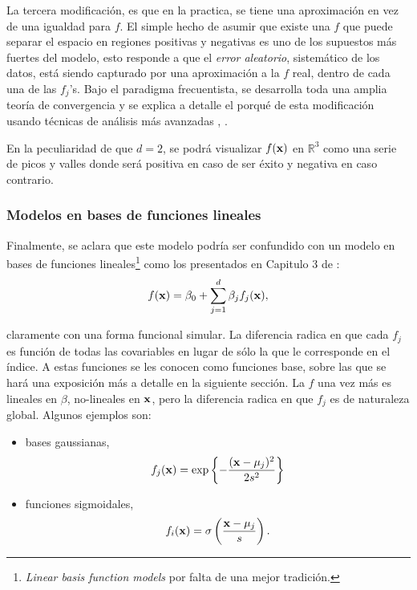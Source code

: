\documentclass[../Main/Main.tex]{subfiles}
\begin{document}
La tercera modificación, es que en la practica, se tiene una aproximación en vez de una igualdad para $f$. El simple hecho de asumir que existe una $f$ que puede separar el espacio en regiones positivas y negativas es uno de los supuestos más fuertes del modelo, esto responde a que el \textit{error aleatorio}, sistemático de los datos, está siendo capturado por una aproximación a la $f$ real, dentro de cada una de las $f_j$'s. Bajo el paradigma frecuentista, se desarrolla toda una amplia teoría de convergencia y se explica a detalle el porqué de esta modificación usando técnicas de análisis más avanzadas \autocite{bergstrom1985estimation}, \autocite{stone1985additive}. 

En la peculiaridad de que $d = 2$, se podrá visualizar $f(\mathbf{x})$ en $\mathbb{R}^3$ como una serie de picos y valles donde será positiva en caso de ser éxito y negativa en caso contrario.

\subsubsection*{Modelos en bases de funciones lineales}

Finalmente, se aclara que este modelo podría ser confundido con un modelo en bases de funciones lineales\footnote{\textit{Linear basis function models} por falta de una mejor tradición.} como los presentados en Capitulo 3 de \citet{bishop2006pattern}:
\begin{align} 
	f(\mathbf{x}) = \beta_0 + \sum_{j = 1}^d\beta_j f_j(\mathbf{x}), \label{ec:ExpansionBases1}
\end{align}

claramente con una forma funcional simular. La diferencia radica en que cada $f_j$ es función de todas las covariables en lugar de sólo la que le corresponde en el índice. A estas funciones se les conocen como funciones base, sobre las que se hará una exposición más a detalle en la siguiente sección. La $f$ una vez más es lineales en $\beta$, no-lineales en $\mathbf{x}$, pero la diferencia radica en que $f_j$ es de naturaleza global. Algunos ejemplos son:

\begin{itemize}[label = {}]
	\item bases gaussianas,
	 $$f_j(\mathbf{x}) = 
	 \exp\left\{-\dfrac{(\mathbf{x} - \mu_j)^2}{2s^2}\right\}$$
	\item funciones sigmoidales,
	$$f_i(\mathbf{x}) = 
	\sigma\left( \dfrac{\mathbf{x} - \mu_j}{s} \right).$$
\end{itemize}
\end{document}
